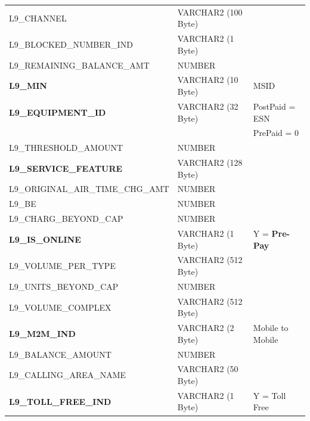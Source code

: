 \documentclass[12pt,twoside]{article}
\begin{document}
\begin{longtable}{lll}
 L9\_CHANNEL                             &  VARCHAR2 (100 Byte)  &                            \\
 L9\_BLOCKED\_NUMBER\_IND                &  VARCHAR2 (1 Byte)    &                            \\
 L9\_REMAINING\_BALANCE\_AMT             &  NUMBER               &                            \\
 \textbf{L9\_MIN}                        &  VARCHAR2 (10 Byte)   &  MSID                      \\
 \textbf{L9\_EQUIPMENT\_ID}              &  VARCHAR2 (32 Byte)   &  PostPaid = ESN            \\
                                         &                       &  PrePaid = 0               \\
 L9\_THRESHOLD\_AMOUNT                   &  NUMBER               &                            \\
 \textbf{L9\_SERVICE\_FEATURE}           &  VARCHAR2 (128 Byte)  &                            \\
 L9\_ORIGINAL\_AIR\_TIME\_CHG\_AMT       &  NUMBER               &                            \\
 L9\_BE                                  &  NUMBER               &                            \\
 L9\_CHARG\_BEYOND\_CAP                  &  NUMBER               &                            \\
 \textbf{L9\_IS\_ONLINE}                 &  VARCHAR2 (1 Byte)    &  Y = \textbf{Pre-Pay}      \\
 L9\_VOLUME\_PER\_TYPE                   &  VARCHAR2 (512 Byte)  &                            \\
 L9\_UNITS\_BEYOND\_CAP                  &  NUMBER               &                            \\
 L9\_VOLUME\_COMPLEX                     &  VARCHAR2 (512 Byte)  &                            \\
 \textbf{L9\_M2M\_IND}                   &  VARCHAR2 (2 Byte)    &  Mobile to Mobile          \\
 L9\_BALANCE\_AMOUNT                     &  NUMBER               &                            \\
 L9\_CALLING\_AREA\_NAME                 &  VARCHAR2 (50 Byte)   &                            \\
 \textbf{L9\_TOLL\_FREE\_IND}            &  VARCHAR2 (1 Byte)    &  Y = Toll Free             \\

\end{longtable}
\end{document}
